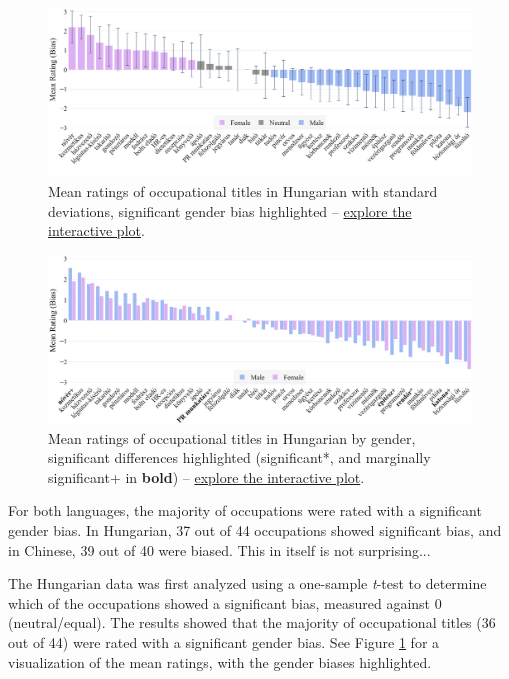 \documentclass[11pt]{article}
\begin{document}
\begin{figure}[!ht]
  \centering
  \includegraphics[width=\linewidth]{../occupations_hu}
  \caption{Mean ratings of occupational titles in Hungarian with standard deviations, significant gender bias highlighted -- \href{https://htmlpreview.github.io/?https://github.com/partigabor/occupational-bias/blob/main/occupations_hu.html}{explore the interactive plot}.}
  \label{fig:occupations_hu}
\end{figure}

\begin{figure}[]
  \centering
  \includegraphics[width=\linewidth]{../occupations_hu_gender}
  \caption{Mean ratings of occupational titles in Hungarian by gender, significant differences highlighted (significant*, and marginally significant+ in \textbf{bold}) -- \href{https://htmlpreview.github.io/?https://github.com/partigabor/occupational-bias/blob/main/occupations_hu_gender.html}{explore the interactive plot}.}
  \label{fig:occupations_hu_gender}
\end{figure}


For both languages, the majority of occupations were rated with a significant gender bias. In Hungarian, 37 out of 44 occupations showed significant bias, and in Chinese, 39 out of 40 were biased. This in itself is not surprising...

The Hungarian data was first analyzed using a one-sample \textit{t}-test to determine which of the occupations showed a significant bias, measured against 0 (neutral/equal). The results showed that the majority of occupational titles (36 out of 44) were rated with a significant gender bias. See Figure \ref{fig:occupations_hu} for a visualization of the mean ratings, with the gender biases highlighted.
\end{document}

